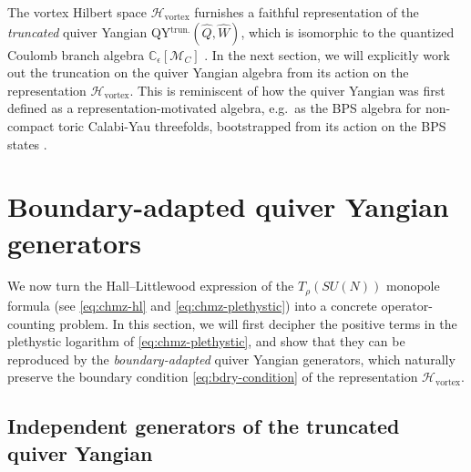 \documentclass[12pt,a4paper]{article}
\newcommand{\eps}{\epsilon}
\begin{document}
\medskip

The vortex Hilbert space $\mathcal H_{\text{vortex}}$ furnishes a faithful representation of the \textit{truncated} quiver Yangian QY$^{\text{trun.}}(\hat{Q},\hat W)$, which is isomorphic to the quantized Coulomb branch algebra $\mathbb C_\eps[\mathcal M_C]$ \cite{ChenLi2026}.
In the next section, we will explicitly work out the truncation on the quiver Yangian algebra from its action on the representation $\mathcal H_{\text{vortex}}$. This is reminiscent of how the quiver Yangian was first defined as a representation-motivated algebra, e.g.\
as the BPS algebra for non-compact toric Calabi-Yau threefolds, bootstrapped from its action on the BPS states \cite{LiYamazaki2020}.




 \section{Boundary-adapted quiver Yangian generators}
\label{sec:boundary-generators}

We now turn the Hall--Littlewood expression of the $T_\rho(SU(N))$ monopole formula (see \eqref{eq:chmz-hl} and \eqref{eq:chmz-plethystic})
into a concrete operator-counting problem. In this section, we will first decipher the positive terms in the plethystic logarithm of \eqref{eq:chmz-plethystic}, and show that they can be reproduced by the \textit{boundary-adapted} quiver Yangian generators, which naturally preserve the boundary condition \eqref{eq:bdry-condition} of the representation $\mathcal H_{\text{vortex}}$.



\subsection{Independent generators of the truncated quiver Yangian}
\end{document}
